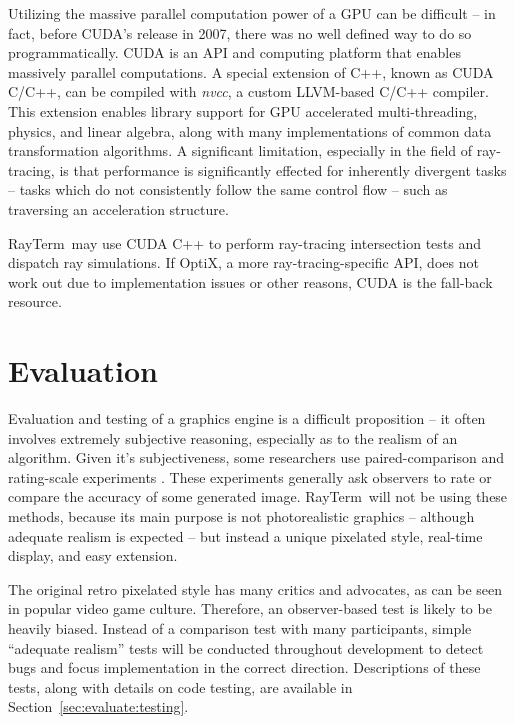 \documentclass[11pt]{article}
\newcommand{\name}{{\sc RayTerm}}
\begin{document}
Utilizing the massive parallel computation power of a GPU can be difficult -- in fact, before CUDA's release in 2007, there was no well defined way to do so programmatically.
CUDA is an API and computing platform that enables massively parallel computations.
A special extension of C++, known as CUDA C/C++, can be compiled with {\it nvcc}, a custom LLVM-based C/C++ compiler.
This extension enables library support for GPU accelerated multi-threading, physics, and linear algebra, along with many implementations of common data transformation algorithms.
A significant limitation, especially in the field of ray-tracing, is that performance is significantly effected for inherently divergent tasks -- tasks which do not consistently follow the same control flow -- such as traversing an acceleration structure.

\name\ may use CUDA C++ to perform ray-tracing intersection tests and dispatch ray simulations.
If OptiX, a more ray-tracing-specific API, does not work out due to implementation issues or other reasons, CUDA is the fall-back resource.

\section{Evaluation}
\label{sec:evaluate}


Evaluation and testing of a graphics engine is a difficult proposition -- it often involves extremely subjective reasoning, especially as to the realism of an algorithm.
Given it's subjectiveness, some researchers use paired-comparison and rating-scale experiments \cite{kuang2007evaluating}.
These experiments generally ask observers to rate or compare the accuracy of some generated image.
\name\ will not be using these methods, because its main purpose is not photorealistic graphics -- although adequate realism is expected -- but instead a unique pixelated style, real-time display, and easy extension.

The original retro pixelated style has many critics and advocates, as can be seen in popular video game culture.
Therefore, an observer-based test is likely to be heavily biased.
Instead of a comparison test with many participants, simple ``adequate realism'' tests will be conducted throughout development to detect bugs and focus implementation in the correct direction.
Descriptions of these tests, along with details on code testing, are available in Section~\ref{sec:evaluate:testing}.
\end{document}

